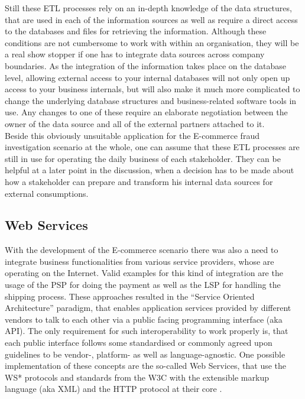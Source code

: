 Still these \gls{ETL} processes rely on an in-depth knowledge of the data structures, that are used in each of the information sources as well as require a direct access to the databases and files for retrieving the information. Although these conditions are not cumbersome to work with within an organisation, they will be a real show stopper if one has to integrate data sources across company boundaries. As the integration of the information takes place on the database level, allowing external access to your internal databases will not only open up access to your business internals, but will also make it much more complicated to change the underlying database structures and business-related software tools in use. Any changes to one of these require an elaborate negotiation between the owner of the data source and all of the external partners attached to it. \\

Beside this obviously unsuitable application for the \gls{E-commerce} fraud investigation scenario at the whole, one can assume that these \gls{ETL} processes are still in use for operating the daily business of each stakeholder. They can be helpful at a later point in the discussion, when a decision has to be made about how a stakeholder can prepare and transform his internal data sources for external consumptions.


\subsection{Web Services}
\label{subsec:web_services}

With the development of the \gls{E-commerce} scenario there was also a need to integrate business functionalities from various service providers, whose are operating on the Internet. Valid examples for this kind of integration are the usage of the \gls{PSP} for doing the payment as well as the \gls{LSP} for handling the shipping process. These approaches resulted in the ``Service Oriented Architecture'' paradigm, that enables application services provided by different vendors to talk to each other via a public facing programming interface (aka \gls{API}). The only requirement for such interoperability to work properly is, that each public interface follows some standardised or commonly agreed upon guidelines to be vendor-, platform- as well as language-agnostic. One possible implementation of these concepts are the so-called Web Services, that use the WS* protocols and standards from the \gls{W3C} with the extensible markup language (aka \gls{XML}) and the \gls{HTTP} protocol at their core \citep{josuttis2007soa}. \\

